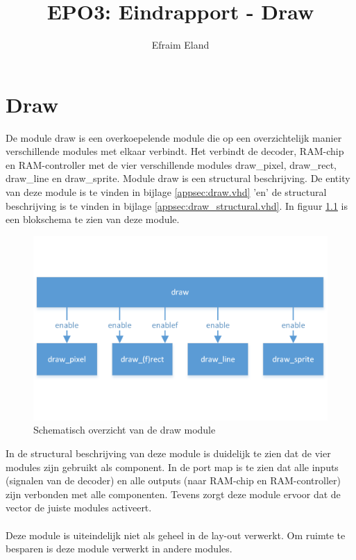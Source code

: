 \documentclass{scrartcl} %
\author{Efraim Eland}
\title{EPO3: Eindrapport - Draw}
\begin{document}
\chapter{Draw}
\label{ch:draw}

De module draw is een overkoepelende module die op een overzichtelijk manier verschillende modules met elkaar verbindt. Het verbindt de decoder, RAM-chip en RAM-controller met de vier verschillende modules draw\_pixel, draw\_rect, draw\_line en draw\_sprite. Module draw is een structural beschrijving. De entity van deze module is te vinden in bijlage \ref{appsec:draw.vhd} 'en' de structural beschrijving is te vinden in bijlage \ref{appsec:draw_structural.vhd}. In figuur \ref{fig:draw} is een blokschema te zien van deze module.

\begin{figure}[H]
	\centering
	\includegraphics[width=\textwidth]{resource/draw.png}
	\caption{Schematisch overzicht van de draw module}
	\label{fig:draw}
\end{figure}

In de structural beschrijving van deze module is duidelijk te zien dat de vier modules zijn gebruikt als component. In de port map is te zien dat alle inputs (signalen van de decoder) en alle outputs (naar RAM-chip en RAM-controller) zijn verbonden met alle componenten. Tevens zorgt deze module ervoor dat de vector de juiste modules activeert.
\\\\
Deze module is uiteindelijk niet als geheel in de lay-out verwerkt. Om ruimte te besparen is deze module verwerkt in andere modules.
\end{document}
